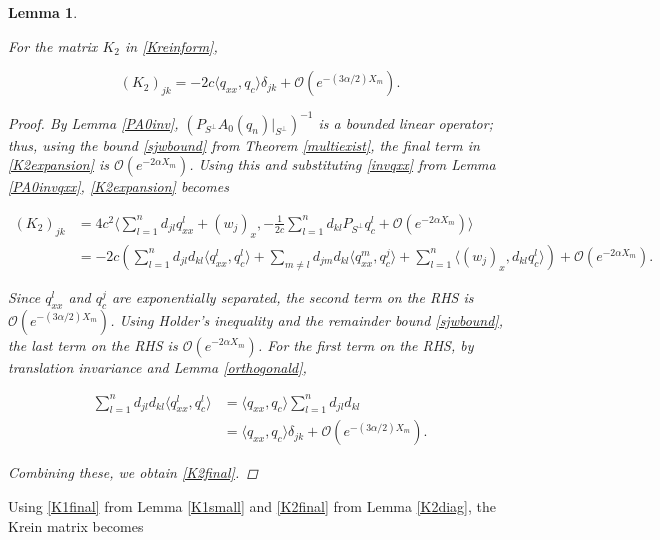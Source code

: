 \documentclass[12pt]{article}
\newtheorem{lemma}{Lemma}
\begin{document}
\begin{lemma}\label{K2diag}

For the matrix $K_2$ in \eqref{Kreinform}, 

\begin{equation}\label{K2final}
(K_2)_{jk} 
= -2 c \langle q_{xx}, q_c \rangle \delta_{jk} + \mathcal{O}(e^{-(3 \alpha/2) X_m}).
\end{equation}

\begin{proof}
By Lemma \ref{PA0inv}, $(P_{S^\perp} A_0(q_n)|_{S^\perp})^{-1}$ is a bounded linear operator; thus, using the bound \eqref{sjwbound} from Theorem \ref{multiexist}, the final term in \eqref{K2expansion} is $\mathcal{O}(e^{-2 \alpha X_m})$. Using this and substituting \eqref{invqxx} from Lemma \ref{PA0invqxx}, \eqref{K2expansion} becomes

\begin{align*}
(K_2)_{jk} 
&= 4 c^2 \langle \sum_{l = 1}^{n} d_{jl} q^l_{xx} + (w_j)_x, 
-\frac{1}{2c}\sum_{l = 1}^{n} d_{kl} P_{S^\perp} q^l_c + \mathcal{O}(e^{-2 \alpha X_m}) \rangle \\
&= -2 c \left( \sum_{l = 1}^{n} d_{jl} d_{kl} \langle q^l_{xx}, q^l_c \rangle
+ \sum_{m\neq l} d_{jm} d_{kl} \langle q^m_{xx}, q^j_c \rangle
+ \sum_{l=1}^n \langle (w_j)_x, d_{kl} q^l_c \rangle \right) + \mathcal{O}(e^{-2 \alpha X_m}).
\end{align*}

Since $q^l_{xx}$ and $q^j_c$ are exponentially separated, the second term on the RHS is $\mathcal{O}(e^{-(3 \alpha/2) X_m})$. Using Holder's inequality and the remainder bound \eqref{sjwbound}, the last term on the RHS is $\mathcal{O}(e^{-2 \alpha X_m})$. For the first term on the RHS, by translation invariance and Lemma \ref{orthogonald},

\begin{align*}
\sum_{l = 1}^{n} d_{jl} d_{kl} \langle q^l_{xx}, q^l_c \rangle
&= \langle q_{xx}, q_c \rangle \sum_{l = 1}^{n} d_{jl} d_{kl} \\
&= \langle q_{xx}, q_c \rangle \delta_{jk} + \mathcal{O}(e^{-(3 \alpha/2) X_m}).
\end{align*}

Combining these, we obtain \eqref{K2final}.

\end{proof}
\end{lemma}

Using \eqref{K1final} from Lemma \ref{K1small} and \eqref{K2final} from Lemma \eqref{K2diag}, the Krein matrix becomes
\end{document}
